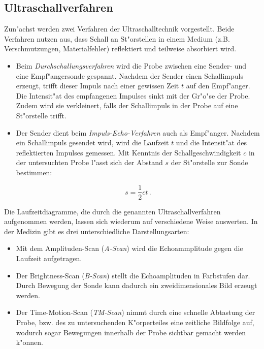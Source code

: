 	\subsection{Ultraschallverfahren}
	\label{subsec:verfahren}
		Zun"achst werden zwei Verfahren der Ultraschalltechnik vorgestellt.
		Beide Verfahren nutzen aus, dass Schall an St"orstellen in einem Medium (z.B. Verschmutzungen, Materialfehler) reflektiert und teilweise absorbiert wird.

		\begin{itemize}
			\item Beim \emph{Durchschallungsverfahren} wird die Probe zwischen eine Sender- und eine Empf"angersonde gespannt.
			Nachdem der Sender einen Schallimpuls erzeugt, trifft dieser Impuls nach einer gewissen Zeit $t$ auf den Empf"anger.
			Die Intensit"at des empfangenen Impulses sinkt mit der Gr"o"se der Probe.
			Zudem wird sie verkleinert, falls der Schallimpuls in der Probe auf eine St"orstelle trifft.

			\item Der Sender dient beim \emph{Impuls-Echo-Verfahren} auch als Empf"anger.
			Nachdem ein Schallimpuls gesendet wird, wird die Laufzeit $t$ und die Intensit"at des reflektierten Impulses gemessen.
			Mit Kenntnis der Schallgeschwindigkeit $c$ in der untersuchten Probe l"asst sich der Abstand $s$ der St"orstelle zur Sonde bestimmen:

			\begin{equation}
				s = \frac{1}{2}ct \,.
			\end{equation}
		\end{itemize}

		Die Laufzeitdiagramme, die durch die genannten Ultraschallverfahren aufgenommen werden, lassen sich wiederum auf verschiedene Weise auswerten.
		In der Medizin gibt es drei unterschiedliche Darstellungsarten:

		\begin{itemize}
			\item Mit dem Amplituden-Scan (\emph{A-Scan}) wird die Echoammplitude gegen die Laufzeit aufgetragen.

			\item Der Brightness-Scan (\emph{B-Scan}) stellt die Echoamplituden in Farbstufen dar.
			Durch Bewegung der Sonde kann dadurch ein zweidimensionales Bild erzeugt werden.

			\item Der Time-Motion-Scan (\emph{TM-Scan}) nimmt durch eine schnelle Abtastung der Probe, bzw. des zu untersuchenden K"orperteiles eine zeitliche Bildfolge auf, wodurch sogar Bewegungen innerhalb der Probe sichtbar gemacht werden k"onnen.
		\end{itemize}